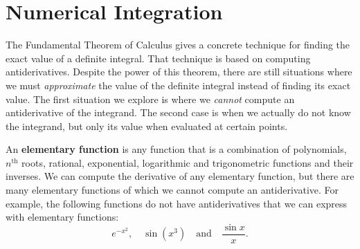 \section{Numerical Integration}\label{sec:numerical_integration}

The Fundamental Theorem of Calculus gives a concrete technique for finding the exact value of a definite integral. That technique is based on computing antiderivatives. Despite the power of this theorem, there are still situations where we must \emph{approximate} the value of the definite integral instead of finding its exact value. The first situation we explore is where we \emph{cannot} compute an antiderivative of the integrand. The second case is when we actually do not know the integrand, but only its value when evaluated at certain points. %
%
\bigskip

%
An \textbf{elementary function} is any function that is a combination of polynomials, $n^{\text{th}}$ roots, rational, exponential, logarithmic and trigonometric functions and their inverses. We can compute the derivative of any elementary function, but there are many elementary functions of which we cannot compute an antiderivative. For example, the following functions do not have antiderivatives that we can express with elementary functions:
\[e^{-x^2}, \quad \sin(x^3)\quad \text{and} \quad \frac{\sin x}{x}.\]

